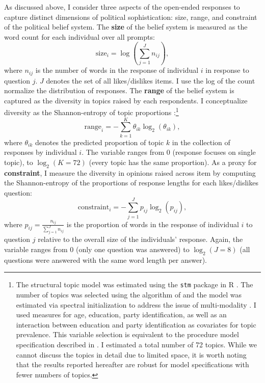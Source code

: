 \documentclass[12pt]{article}
\begin{document}
As discussed above, I consider three aspects of the open-ended responses to capture distinct dimensions of political sophistication: size, range, and constraint of the political belief system. The \textbf{size} of the belief system is measured as the word count for each individual over all prompts:
\begin{equation}
\text{size}_i = \log\left(\sum_{j=1}^J n_{ij}\right),
\end{equation}
where $n_{ij}$ is the number of words in the response of individual $i$ in response to question $j$. $J$ denotes the set of all likes/dislikes items. I use the log of the count normalize the distribution of responses. The \textbf{range} of the belief system is captured as the diversity in topics raised by each respondents. I conceptualize diversity as the Shannon-entropy of topic proportions \citep{shannon1948mathematical,munger2016elites}:\footnote{The structural topic model was estimated using the \texttt{stm} package in R \citep{roberts2014structural}. The number of topics was selected using the algorithm of \citet{lee2014low} and the model was estimated via spectral initialization to address the issue of multi-modality \citep[see][for details]{roberts2014stm}. I used measures for age, education, party identification, as well as an interaction between education and party identification as covariates for topic prevalence. This variable selection is equivalent to the procedure model specification described in \citet{roberts2014structural}. I estimated a total number of 72 topics. While we cannot discuss the topics in detail due to limited space, it is worth noting that the results reported hereafter are robust for model specifications with fewer numbers of topics.}
\begin{equation}
\text{range}_i = −\sum_{k=1}^K \theta_{ik} \log_2(\theta_{ik}),
\end{equation}
where $\theta_{ik}$ denotes the predicted proportion of topic $k$ in the collection of responses by individual $i$. The variable ranges from 0 (response focuses on single topic), to $\log_2(K=72)$ (every topic has the same proportion). As a proxy for \textbf{constraint}, I measure the diversity in opinions raised across item by computing the Shannon-entropy of the proportions of response lengths for each likes/dislikes question:
\begin{equation}
\text{constraint}_i = −\sum_{j=1}^J p_{ij} \log_2(p_{ij}),
\end{equation}
where $p_{ij}=\tfrac{n_{ij}}{\sum_{j=1}^J n_{ij}}$ is the proportion of words in the response of individual $i$ to question $j$ relative to the overall size of the individuals' response. Again, the variable ranges from 0 (only one question was answered) to $\log_2(J=8)$ (all questions were answered with the same word length per answer).
\end{document}
